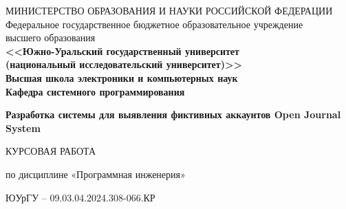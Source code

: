 \newpage
\thispagestyle{empty}
\begin{adjustwidth}[]{0cm}{0cm}
\begin{center}
\begin{linespread}{1}


\small{
МИНИСТЕРСТВО ОБРАЗОВАНИЯ И НАУКИ РОССИЙСКОЙ ФЕДЕРАЦИИ\\
Федеральное государственное бюджетное образовательное учреждение\\
высшего образования\\
\textbf{<<Южно-Уральский государственный университет\\
(национальный исследовательский университет)>>\\
Высшая школа электроники и компьютерных наук\\
Кафедра системного программирования}
}






{
\large\textbf{Разработка системы для выявления фиктивных аккаунтов Open Journal System}

\vspace{1em}

\large{КУРСОВАЯ РАБОТА}

\vspace{-5pt}

\large{по дисциплине «Программная инженерия»}

\vspace{-5pt}

\large{ЮУрГУ – 09.03.04.2024.308-066.КР}

\vspace{-5pt}
}

\vspace{7em}


\end{linespread}
\end{center}
\end{adjustwidth}
